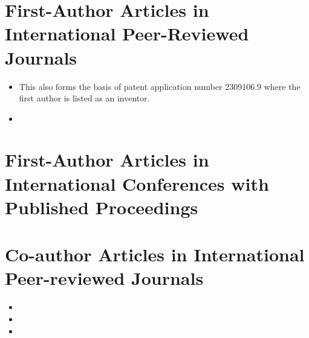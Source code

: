 \section{First-Author Articles in International Peer-Reviewed Journals}
\begin{itemize}
\item {} 

This also forms the basis of patent application number 2309106.9 where the first author is listed as an inventor.

\item {}
% 
\end{itemize}

\section{First-Author Articles in International Conferences with Published Proceedings}

\section{Co-author Articles in International Peer-reviewed Journals}
\begin{itemize}
\item {}

\item {}

\item {}
\end{itemize}
